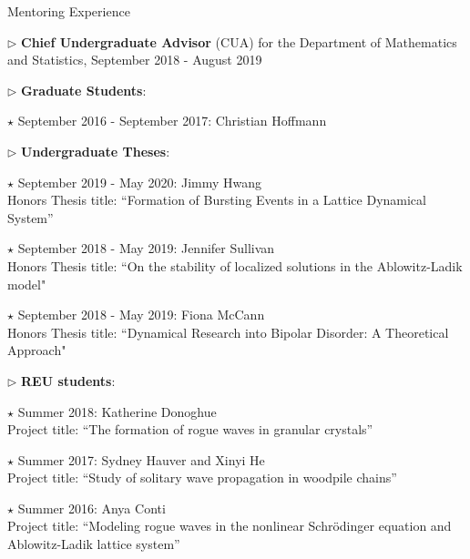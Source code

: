 \documentclass[10pt]{article} %
\newenvironment{outerlist}[1][\enskip\textbullet]%
        {\begin{itemize}[#1]}{\end{itemize}%
         \vspace{-.6\baselineskip}}
\newenvironment{innerlist}[1][\enskip\textbullet]%
        {\begin{compactitem}[#1]}{\end{compactitem}}
\begin{document}
\begin{section}{Mentoring Experience}
\begin{outerlist}
\begin{innerlist}
\item[$\triangleright$] \textbf{Chief Undergraduate Advisor} 
(CUA) for the Department of Mathematics and Statistics, September 2018 - August 2019
\item[$\triangleright$] \textbf{Graduate Students}:
\begin{innerlist}
\item[$\star$] September 2016 - September 2017: Christian Hoffmann
\end{innerlist}
\item[$\triangleright$] \textbf{Undergraduate Theses}:
\begin{innerlist}
\item[$\star$] September 2019 - May 2020: Jimmy Hwang\\
Honors Thesis title: ``Formation of Bursting Events in a Lattice Dynamical System''
\item[$\star$] September 2018 - May 2019: Jennifer Sullivan\\
Honors Thesis title: ``On the stability of localized solutions in the Ablowitz-Ladik model"
\item[$\star$] September 2018 - May 2019: Fiona McCann\\
Honors Thesis title: ``Dynamical Research into Bipolar Disorder: A Theoretical Approach"
\end{innerlist}
\item[$\triangleright$] \textbf{REU students}:
\begin{innerlist}
\item[$\star$] Summer 2018: Katherine Donoghue\\
Project title: ``The formation of rogue waves in granular crystals''
\item[$\star$]  Summer 2017: Sydney Hauver and Xinyi He\\
Project title: ``Study of solitary wave propagation in woodpile chains''
\item[$\star$] Summer 2016: Anya Conti \\
Project title: ``Modeling rogue waves in the nonlinear Schr\"odinger 
equation and Ablowitz-Ladik lattice system''
\end{innerlist}

\end{innerlist}
\end{outerlist}

\end{section}
\end{document}
